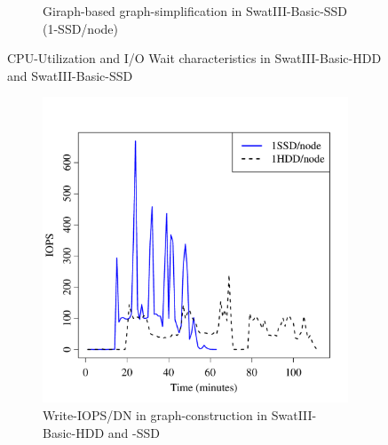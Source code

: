 \documentclass[10pt, conference, compsocconf]{IEEEtran}
\begin{document}
\begin{figure}[htb]
\begin{subfigure}[b]{0.23\textwidth}
                \caption{Giraph-based graph-simplification in SwatIII-Basic-SSD (1-SSD/node)}
                \label{fig:ECCPUSSD}
        \end{subfigure}
        \caption{CPU-Utilization and I/O Wait characteristics in SwatIII-Basic-HDD and SwatIII-Basic-SSD}\label{fig:HddSsdCPU}
        \vspace{-1.5em}
\end{figure}

\begin{figure}[htb]   
        \begin{subfigure}[b]{0.23\textwidth}
                \includegraphics[width=\textwidth]{Figure/SystemData/Plots/BGHddSsdWrIops.pdf}
                \caption{Write-IOPS/DN in graph-construction in SwatIII-Basic-HDD and -SSD}
                \label{fig:BGHddSsdWrIops}
        \end{subfigure}
        \begin{subfigure}[b]{0.23\textwidth}

\end{subfigure}
\end{figure}
\end{document}
